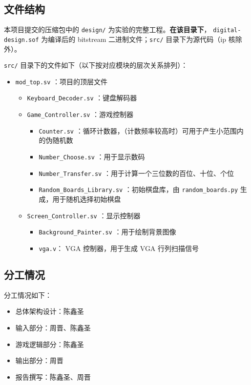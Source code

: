 \subsection{文件结构}

本项目提交的压缩包中的 \verb|design/| 为实验的完整工程。\textbf{在该目录下}， \texttt{digital-design.sof} 为编译后的 bitstream 二进制文件；\texttt{src/} 目录下为源代码（ip 核除外）。

\texttt{src/} 目录下的文件如下（以下按对应模块的层次关系排列）：

\begin{itemize}
    \item \texttt{mod\_top.sv} ：项目的顶层文件
    \begin{itemize}
        \item \texttt{Keyboard\_Decoder.sv} ：键盘解码器
        \item \texttt{Game\_Controller.sv} ：游戏控制器
        \begin{itemize}
            \item \texttt{Counter.sv} ：循环计数器，（计数频率较高时）可用于产生小范围内的伪随机数
            \item \texttt{Number\_Choose.sv} ：用于显示数码
            \item \texttt{Number\_Transfer.sv} ：用于计算一个三位数的百位、十位、个位
            \item \texttt{Random\_Boards\_Library.sv} ：初始棋盘库，由 \texttt{random\_boards.py} 生成，用于随机选择初始棋盘
        \end{itemize}
        \item \texttt{Screen\_Controller.sv} ：显示控制器
        \begin{itemize}
            \item \texttt{Background\_Painter.sv} ：用于绘制背景图像
            \item \texttt{vga.v}： VGA 控制器，用于生成 VGA 行列扫描信号
        \end{itemize}
    \end{itemize}
\end{itemize}


\subsection{分工情况}

分工情况如下：
\begin{itemize}
    \item 总体架构设计：陈鑫圣
    \item 输入部分：周晋、陈鑫圣
    \item 游戏逻辑部分：陈鑫圣
    \item 输出部分：周晋
    \item 报告撰写：陈鑫圣、周晋
\end{itemize}